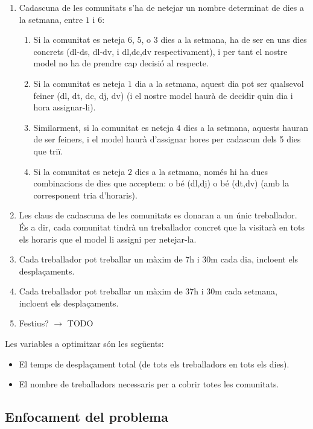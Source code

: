 \documentclass[12pt]{article}
\begin{document}
\begin{enumerate}
	\item Cadascuna de les comunitats s'ha de netejar un nombre determinat de dies a la setmana, entre $1$ i $6$:
		\begin{enumerate}
			\item Si la comunitat es neteja $6$, $5$, o $3$ dies a la setmana, ha de ser en uns dies concrets (dl-ds, dl-dv, i dl,dc,dv respectivament), i per tant el nostre model no ha de prendre cap decisió al respecte.
			\item Si la comunitat es neteja $1$ dia a la setmana, aquest dia pot ser qualsevol feiner (dl, dt, dc, dj, dv) (i el nostre model haurà de decidir quin dia i hora assignar-li).
			\item Similarment, si la comunitat es neteja $4$ dies a la setmana, aquests hauran de ser feiners, i el model haurà d'assignar hores per cadascun dels 5 dies que triï.
			\item \label{item:2diessetmana} Si la comunitat es neteja $2$ dies a la setmana, només hi ha dues combinacions de dies que acceptem: o bé (dl,dj) o bé (dt,dv) (amb la corresponent tria d'horaris).
		\end{enumerate}

	\item Les claus de cadascuna de les comunitats es donaran a un únic treballador.
		És a dir, cada comunitat tindrà un treballador concret que la visitarà en tots els horaris que el model li assigni per netejar-la.
	\item Cada treballador pot treballar un màxim de 7h i 30m cada dia, incloent els desplaçaments.
	\item Cada treballador pot treballar un màxim de 37h i 30m cada setmana, incloent els desplaçaments.
	\item Festius? $\rightarrow$ TODO
\end{enumerate}

Les variables a optimitzar són les següents:

\begin{itemize}
	\item El temps de desplaçament total (de tots els treballadors en tots els dies).
	\item El nombre de treballadors necessaris per a cobrir totes les comunitats.
\end{itemize}

\subsection{Enfocament del problema}
\end{document}

